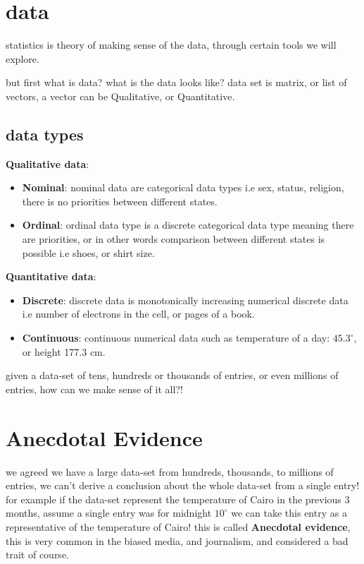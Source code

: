 \documentclass[4apaper,12pt]{book}
\begin{document}
  \section{data}
  \begin{description}
  \item statistics is theory of making sense of the data, through certain tools we will explore.
  \item but first what is data? what is the data looks like? data set is matrix, or list of vectors, a vector can be Qualitative, or Quantitative.
    \subsection{data types}
  \item \textbf{Qualitative data}:
    \begin{itemize}
    \item \textbf{Nominal}: nominal data are categorical data types i.e  sex, status, religion, there is no priorities between different states.
    \item \textbf{Ordinal}: ordinal data type is a discrete categorical data type meaning there are priorities, or in other words comparison between different states is possible i.e shoes, or shirt size.
    \end{itemize}
  \item \textbf{Quantitative data}:
    \begin{itemize}
    \item \textbf{Discrete}: discrete data is monotonically increasing numerical discrete data i.e number of electrons in the cell, or pages of a book.
    \item \textbf{Continuous}: continuous numerical data such as temperature of a day: $45.3^\circ$, or height 177.3 cm.
    \end{itemize}
  \item given a data-set of tens, hundreds or thousands of entries, or even millions of entries, how can we make sense of it all?!
  \end{description}
  \section{Anecdotal Evidence}
  \begin{description}
  \item we agreed we have a large data-set from hundreds, thousands, to millions of entries, we can't derive a conclusion about the whole data-set from a single entry! for example if the data-set represent  the temperature of Cairo in the previous 3 months, assume a single entry was for midnight $10^\circ$ we can take this entry as a representative of the temperature of Cairo! this is called \textbf{Anecdotal evidence}, this is very common in the biased media, and journalism, and considered a bad trait of course.
  \end{description}
\end{document}
